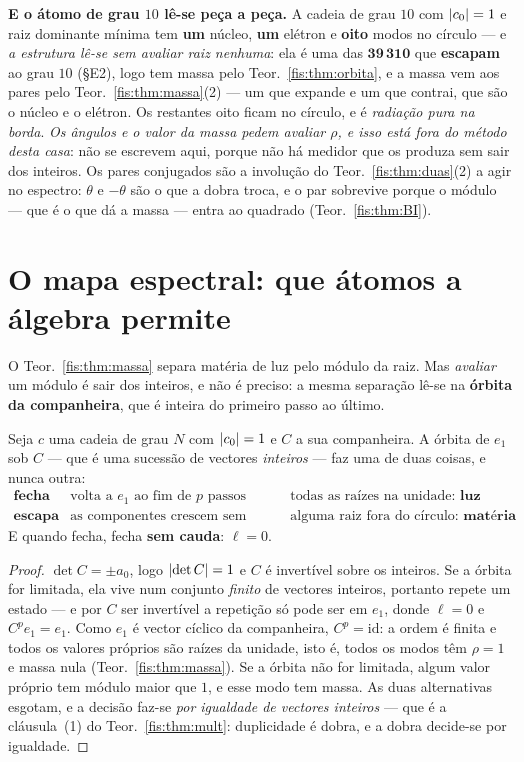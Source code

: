 \documentclass[livro.tex]{subfiles}
\begin{document}
\medskip\noindent\textbf{E o átomo de grau $10$ lê-se peça a peça.} A cadeia de
grau $10$ com $\lvert c_0\rvert=1$ e raiz dominante mínima tem \textbf{um} núcleo,
\textbf{um} elétron e \textbf{oito} modos no círculo --- e \emph{a estrutura
lê-se sem avaliar raiz nenhuma}: ela é uma das $\mathbf{39\,310}$ que
\textbf{escapam} ao grau $10$ (§E2), logo tem massa pelo
Teor.~\ref{fis:thm:orbita}, e a massa vem aos pares pelo
Teor.~\ref{fis:thm:massa}(2) --- um que expande e um que contrai, que são o
núcleo e o elétron. Os restantes oito ficam no círculo, e é \emph{radiação pura
na borda}. \emph{Os ângulos e o valor da massa pedem avaliar $\rho$, e isso está
fora do método desta casa}: não se escrevem aqui, porque não há medidor que os
produza sem sair dos inteiros. Os pares conjugados são a involução do Teor.~\ref{fis:thm:duas}(2) a agir no espectro: $\theta$ e $-\theta$
são o que a dobra troca, e o par sobrevive porque o módulo --- que é o que dá a
massa --- entra ao quadrado (Teor.~\ref{fis:thm:BI}).

\section{O mapa espectral: que átomos a álgebra permite}\label{fis:mapa}

\noindent O Teor.~\ref{fis:thm:massa} separa matéria de luz pelo módulo da raiz.
Mas \emph{avaliar} um módulo é sair dos inteiros, e não é preciso: a mesma
separação lê-se na \textbf{órbita da companheira}, que é inteira do primeiro
passo ao último.

\begin{teorema}\label{fis:thm:orbita}
Seja $c$ uma cadeia de grau $N$ com $\lvert c_0\rvert=1$ e $C$ a sua companheira. A órbita de $e_1$ sob $C$ --- que é uma sucessão de vectores \emph{inteiros} ---
faz uma de duas coisas, e nunca outra:
\[
\begin{array}{lll}
\textbf{fecha} & \text{volta a }e_1\text{ ao fim de }p\text{ passos}
  & \text{todas as raízes na unidade: } \textbf{luz}\\[2pt]
\textbf{escapa} & \text{as componentes crescem sem limite}
  & \text{alguma raiz fora do círculo: } \textbf{matéria}
\end{array}
\]
E quando fecha, fecha \textbf{sem cauda}: $\ell=0$.
\end{teorema}

\begin{proof}
$\det C=\pm a_0$, logo $\lvert \det C\rvert=1$ e $C$ é invertível sobre os inteiros. Se
a órbita for limitada, ela vive num conjunto \emph{finito} de vectores inteiros,
portanto repete um estado --- e por $C$ ser invertível a repetição só pode ser em
$e_1$, donde $\ell=0$ e $C^{p}e_1=e_1$. Como $e_1$ é vector cíclico da
companheira, $C^{p}=\mathrm{id}$: a ordem é finita e todos os valores próprios
são raízes da unidade, isto é, todos os modos têm $\rho=1$ e massa nula
(Teor.~\ref{fis:thm:massa}). Se a órbita não for limitada, algum valor próprio
tem módulo maior que $1$, e esse modo tem massa. As duas alternativas esgotam, e
a decisão faz-se \emph{por igualdade de vectores inteiros} --- que é a
cláusula~(1) do Teor.~\ref{fis:thm:mult}: duplicidade é dobra, e a dobra
decide-se por igualdade.
\end{proof}
\end{document}
